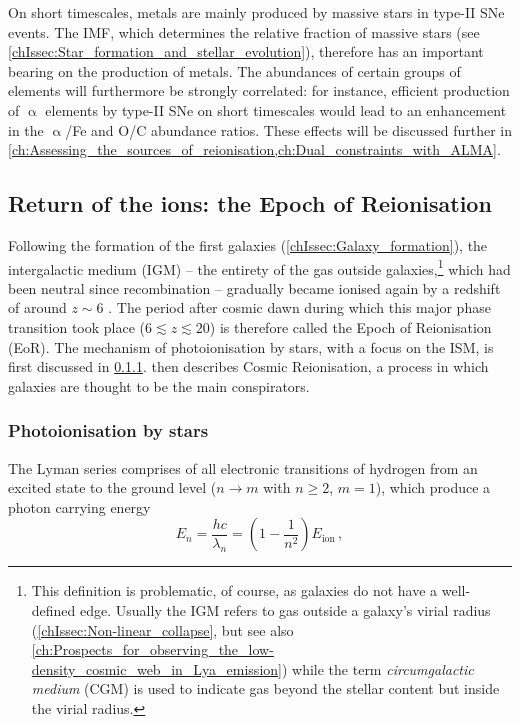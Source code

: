 On short timescales, metals are mainly produced by massive stars in type-II SNe events. The IMF, which determines the relative fraction of massive stars (see \cref{chIssec:Star_formation_and_stellar_evolution}), therefore has an important bearing on the production of metals. The abundances of certain groups of elements will furthermore be strongly correlated: for instance, efficient production of $\upalpha$ elements by type-II SNe on short timescales would lead to an enhancement in the $\upalpha$/Fe and O/C abundance ratios. These effects will be discussed further in \cref{ch:Assessing_the_sources_of_reionisation,ch:Dual_constraints_with_ALMA}.

\subsection{Return of the ions: the Epoch of Reionisation}
\label{chIssec:Epoch_of_Reionisation}

Following the formation of the first galaxies (\cref{chIssec:Galaxy_formation}), the intergalactic medium (IGM) -- the entirety of the gas outside galaxies,\footnote{This definition is problematic, of course, as galaxies do not have a well-defined edge. Usually the IGM refers to gas outside a galaxy's virial radius (\cref{chIssec:Non-linear_collapse}, but see also \cref{ch:Prospects_for_observing_the_low-density_cosmic_web_in_Lya_emission}) while the term \textit{circumgalactic medium} (CGM) is used to indicate gas beyond the stellar content but inside the virial radius.} which had been neutral since recombination -- gradually became ionised again by a redshift of around $z \sim 6$ \citep{2021arXiv211013160R}. The period after cosmic dawn during which this major phase transition took place ($6 \lesssim z \lesssim 20$) is therefore called the Epoch of Reionisation (EoR). The mechanism of photoionisation by stars, with a focus on the ISM, is first discussed in \cref{chIsssec:Photoionisation_by_stars}.  then describes Cosmic Reionisation, a process in which galaxies are thought to be the main conspirators.

\subsubsection{Photoionisation by stars}
\label{chIsssec:Photoionisation_by_stars}

The Lyman series comprises of all electronic transitions of hydrogen from an excited state to the ground level ($n \rightarrow m$ with $n \geq 2$, $m = 1$), which produce a photon carrying energy
\begin{equation}
    \label{chIeq:Lyman_series_energies}
    E_n = \frac{hc}{\lambda_n} = \left( 1 - \frac{1}{n^2} \right) E_\text{ion} \, ,
\end{equation}

